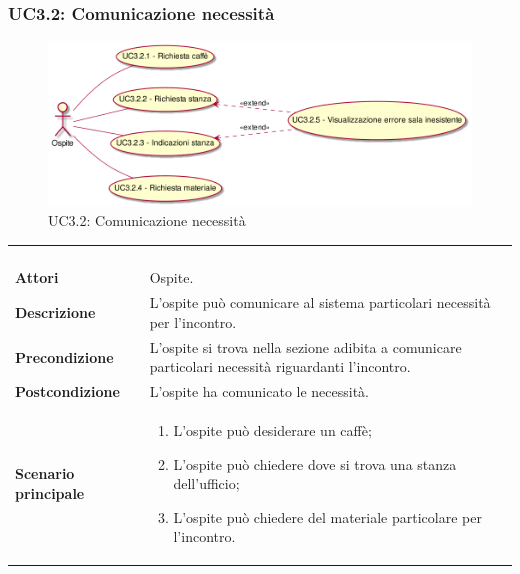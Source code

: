 \subsubsection{UC3.2: Comunicazione necessità}
\label{UC3.2}
\begin{figure}[h]
\centering
\includegraphics[width=\textwidth,height=\textheight,keepaspectratio]{images/UseCaseUC32.png}
\caption{UC3.2: Comunicazione necessità}
\end{figure}
\begin{longtable}{l|p{10cm}}
\rowcolor[gray]{0.8} \multicolumn{2}{c}{} \\
\rowcolor[gray]{0.8} \multicolumn{2}{c}{\textbf{UC3.2 - Comunicazione necessità}} \\
\rowcolor[gray]{0.8} \multicolumn{2}{c}{} \\
\hline
&\\
\textbf{Attori} & Ospite.\\[7pt]
\textbf{Descrizione} & L'ospite può comunicare al sistema particolari necessità per l'incontro.\\[7pt]
\textbf{Precondizione} & L'ospite si trova nella sezione adibita a comunicare particolari necessità riguardanti l'incontro.\\[7pt]
\textbf{Postcondizione} & L'ospite ha comunicato le necessità.\\[7pt]
\textbf{Scenario principale} &\begin{enumerate}
\item  L'ospite può desiderare un caffè;
\item  L'ospite può chiedere dove si trova una stanza dell'ufficio;
\item  L'ospite può chiedere del materiale particolare per l'incontro.
\end{enumerate}
\\[7pt]\hline
\end{longtable}

